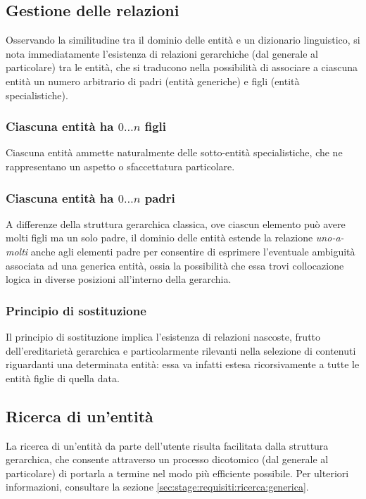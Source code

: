 \documentclass[10pt,a4paper,headinclude,footinclude,hidelinks]{scrreprt} %
\begin{document}
	\subsection{Gestione delle relazioni}
	\label{sec:stage:requisiti:entità:relazioni}

	Osservando la similitudine tra il dominio delle entità e un dizionario linguistico, si nota immediatamente l'esistenza di relazioni gerarchiche (dal generale al particolare) tra le entità, che si traducono nella possibilità di associare a ciascuna entità un numero arbitrario di padri (entità generiche) e figli (entità specialistiche).

	\subsubsection{Ciascuna entit\`a ha $0\ldots n$ figli}
	Ciascuna entità ammette naturalmente delle sotto-entità specialistiche, che ne rappresentano un aspetto o sfaccettatura particolare.
	\subsubsection{Ciascuna entit\`a ha $0\ldots n$ padri}
	A differenze della struttura gerarchica classica, ove ciascun elemento può avere molti figli ma un solo padre, il dominio delle entità estende la relazione \textit{uno-a-molti} anche agli elementi padre per consentire di esprimere l'eventuale ambiguità associata ad una generica entità, ossia la possibilità che essa trovi collocazione logica in diverse posizioni all'interno della gerarchia.
	\subsubsection{Principio di sostituzione}
	Il principio di sostituzione implica l'esistenza di relazioni nascoste, frutto dell'ereditarietà gerarchica e particolarmente rilevanti nella selezione di contenuti riguardanti una determinata entità: essa va infatti estesa ricorsivamente a tutte le entità figlie di quella data.   
	\subsection{Ricerca di un'entit\`a}
	La ricerca di un'entità da parte dell'utente risulta facilitata dalla struttura gerarchica, che consente attraverso un processo dicotomico (dal generale al particolare) di portarla a termine nel modo più efficiente possibile. Per ulteriori informazioni, consultare la sezione \ref{sec:stage:requisiti:ricerca:generica}. 
\end{document}
